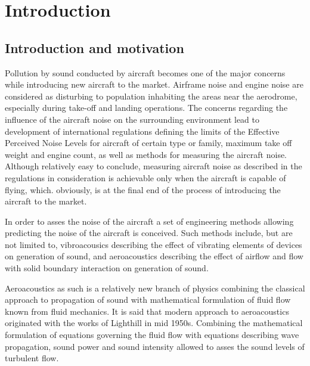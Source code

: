 
\chapter{Introduction} %

\label{introduction} %


\section{Introduction and motivation}

Pollution by sound conducted by aircraft becomes one of the major concerns while introducing new aircraft to the market. Airframe noise and engine noise are considered as disturbing to population inhabiting the areas near the aerodrome, especially during take-off and landing operations. The concerns regarding the influence of the aircraft noise on the surrounding environment lead to development of international regulations defining the limits of the Effective Perceived Noise Levels for aircraft of certain type or family, maximum take off weight and engine count, as well as methods for measuring the aircraft noise. Although relatively easy to conclude, measuring aircraft noise as described in the regulations in consideration is achievable only when the aircraft is capable of flying, which. obviously, is at the final end of the process of introducing the aircraft to the market.

In order to asses the noise of the aircraft a set of engineering methods allowing predicting the noise of the aircraft is conceived. Such methods include, but are not limited to, vibroacousics describing the effect of vibrating elements of devices on generation of sound, and  aeroacoustics describing the effect of airflow and flow with solid boundary interaction on generation of sound.

Aeroacoustics as such is a relatively new branch of physics combining the classical approach to propagation of sound with mathematical formulation of fluid flow known from fluid mechanics. It is said that modern approach to aeroacoustics originated with the works of Lighthill \citep{Light1} \citep{Light2} in mid 1950s. Combining the mathematical formulation of equations governing the fluid flow with equations describing wave propagation, sound power and sound intensity allowed to asses the sound levels of turbulent flow.

